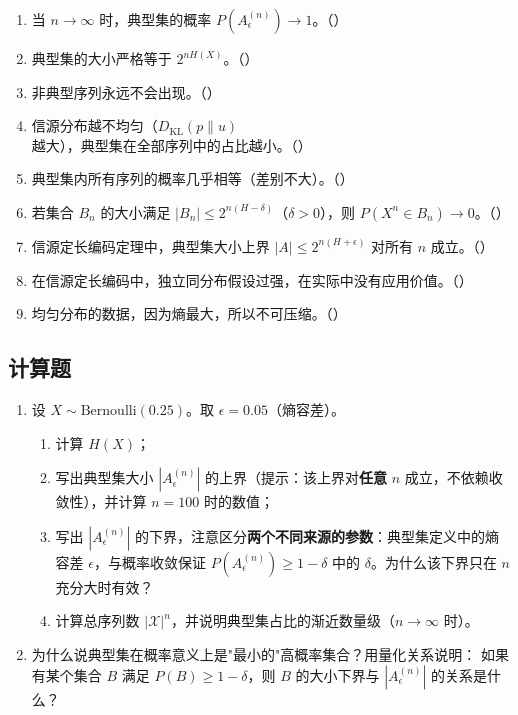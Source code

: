 \documentclass[12pt,a4paper]{ctexart}
\newcommand{\XX}{\mathcal{X}}
\newcommand{\DKL}{D_{\mathrm{KL}}}
\begin{document}
\begin{enumerate}[label=\arabic*., leftmargin=*]
\item 当 $n \to \infty$ 时，典型集的概率 $P(A_\epsilon^{(n)}) \to 1$。（\quad）
\item 典型集的大小严格等于 $2^{nH(X)}$。（\quad）
\item 非典型序列永远不会出现。（\quad）
\item 信源分布越不均匀（$\DKL(p\|u)$越大），典型集在全部序列中的占比越小。（\quad）
\item 典型集内所有序列的概率几乎相等（差别不大）。（\quad）
\item 若集合 $B_n$ 的大小满足 $|B_n| \leq 2^{n(H-\delta)}$（$\delta>0$），则 $P(X^n \in B_n) \to 0$。（\quad）
\item 信源定长编码定理中，典型集大小上界 $|A| \leq 2^{n(H+\epsilon)}$ 对所有 $n$ 成立。（\quad）
\item 在信源定长编码中，独立同分布假设过强，在实际中没有应用价值。（\quad）
\item 均匀分布的数据，因为熵最大，所以不可压缩。（\quad）
\end{enumerate}

\subsection*{计算题}

\begin{enumerate}[label=\textbf{\arabic*.}, leftmargin=*]
\item 设 $X \sim \mathrm{Bernoulli}(0.25)$。取 $\epsilon = 0.05$（熵容差）。
\begin{enumerate}
  \item 计算 $H(X)$；
  \item 写出典型集大小 $|A_\epsilon^{(n)}|$ 的上界（提示：该上界对\textbf{任意} $n$ 成立，不依赖收敛性），并计算 $n=100$ 时的数值；
  \item 写出 $|A_\epsilon^{(n)}|$ 的下界，注意区分\textbf{两个不同来源的参数}：典型集定义中的熵容差 $\epsilon$，与概率收敛保证 $P(A_\epsilon^{(n)}) \geq 1-\delta$ 中的 $\delta$。为什么该下界只在 $n$ 充分大时有效？
  \item 计算总序列数 $|\XX|^n$，并说明典型集占比的渐近数量级（$n\to\infty$ 时）。
\end{enumerate}

\item 为什么说典型集在概率意义上是"最小的"高概率集合？用量化关系说明：
如果有某个集合 $B$ 满足 $P(B) \geq 1-\delta$，则 $B$ 的大小下界与 $|A_\epsilon^{(n)}|$ 的关系是什么？
\end{enumerate}
\end{document}
